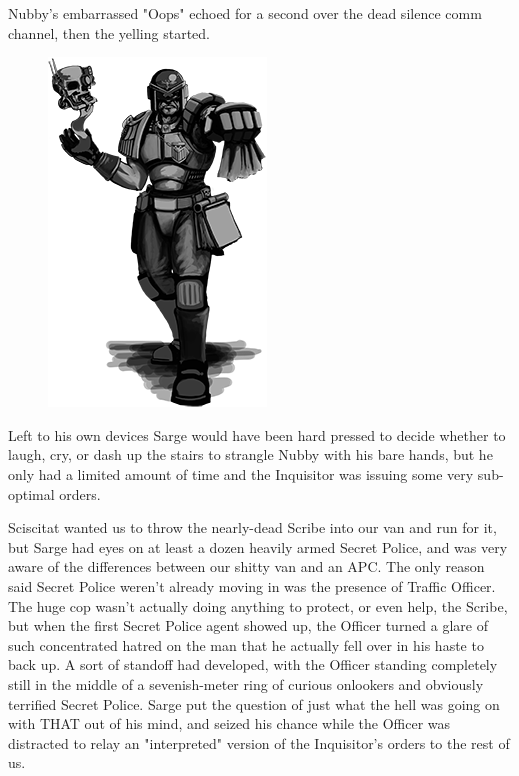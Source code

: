 Nubby's embarrassed "Oops" echoed for a second over the dead silence comm channel, then the yelling started.

\begin{figure}
	\begin{center}
		\includegraphics[width=\figwidth]{pics/17/48.png}
	\end{center}
\end{figure}
Left to his own devices Sarge would have been hard pressed to decide whether to laugh, cry, or dash up the stairs to strangle Nubby with his bare hands, but he only had a limited amount of time and the Inquisitor was issuing some very sub-optimal orders.

Sciscitat wanted us to throw the nearly-dead Scribe into our van and run for it, but Sarge had eyes on at least a dozen heavily armed Secret Police, and was very aware of the differences between our shitty van and an APC. 
The only reason said Secret Police weren't already moving in was the presence of Traffic Officer. 
The huge cop wasn't actually doing anything to protect, or even help, the Scribe, but when the first Secret Police agent showed up, the Officer turned a glare of such concentrated hatred on the man that he actually fell over in his haste to back up. 
A sort of standoff had developed, with the Officer standing completely still in the middle of a sevenish-meter ring of curious onlookers and obviously terrified Secret Police. 
Sarge put the question of just what the hell was going on with THAT out of his mind, and seized his chance while the Officer was distracted to relay an "interpreted" version of the Inquisitor's orders to the rest of us. 



